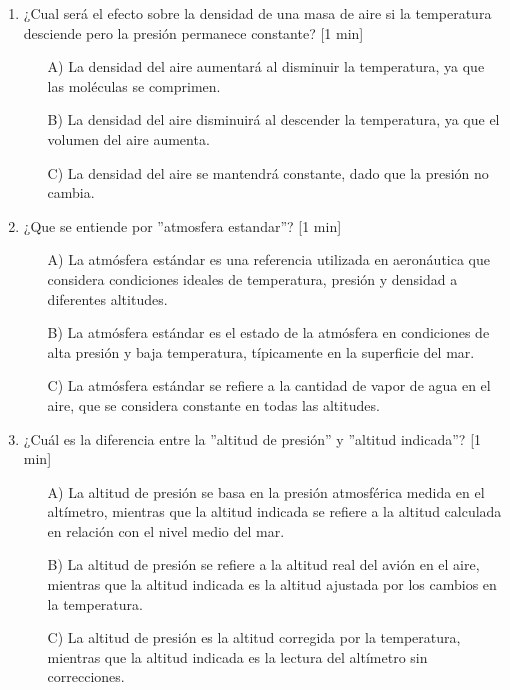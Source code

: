 \begin{enumerate}
\item ¿Cual será el efecto sobre la densidad de una masa de aire si la temperatura desciende pero la presión permanece constante? [1 min]

    \begin{itemize}
    \item[A)] La densidad del aire aumentará al disminuir la temperatura, ya que las moléculas se comprimen.
     \item[B)] La densidad del aire disminuirá al descender la temperatura, ya que el volumen del aire aumenta.
    \item[C)] La densidad del aire se mantendrá constante, dado que la presión no cambia.\\
     \end{itemize}

\item ¿Que se entiende por ''atmosfera estandar''? [1 min]
    \begin{itemize}
    \item[A)] La atmósfera estándar es una referencia utilizada en aeronáutica que considera condiciones ideales de temperatura, presión y densidad a diferentes altitudes.
    \item[B)] La atmósfera estándar es el estado de la atmósfera en condiciones de alta presión y baja temperatura, típicamente en la superficie del mar.
    \item[C)] La atmósfera estándar se refiere a la cantidad de vapor de agua en el aire, que se considera constante en todas las altitudes.\\
     \end{itemize}

\item ¿Cuál es la diferencia entre la ''altitud de presión'' y ''altitud indicada''? [1 min]
\begin{itemize}
    \item[A)] La altitud de presión se basa en la presión atmosférica medida en el altímetro, mientras que la altitud indicada se refiere a la altitud calculada en relación con el nivel medio del mar.
    \item[B)] La altitud de presión se refiere a la altitud real del avión en el aire, mientras que la altitud indicada es la altitud ajustada por los cambios en la temperatura.
    \item[C)] La altitud de presión es la altitud corregida por la temperatura, mientras que la altitud indicada es la lectura del altímetro sin correcciones.\\
\end{itemize}


\end{enumerate}
